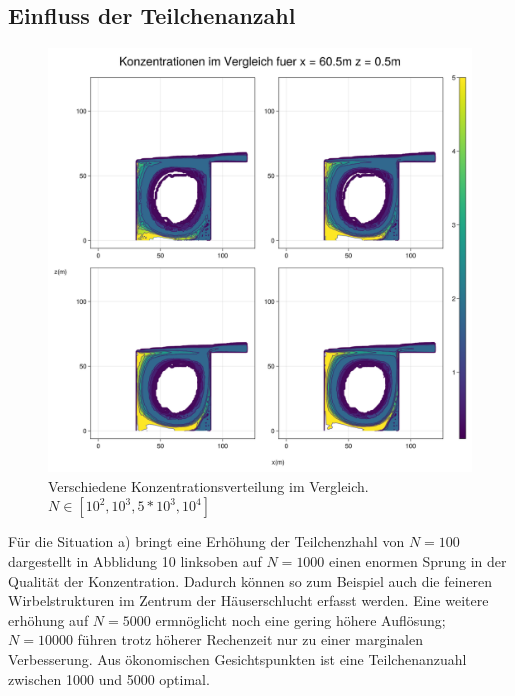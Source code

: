 \documentclass[ngerman]{scrartcl}
\begin{document}
\subsection{Einfluss der Teilchenanzahl}
\begin{figure}[H]
	\centering
	\includegraphics[scale=0.3]{Bilder/3_vergleich_x = 60.5.png}
	\caption{ Verschiedene Konzentrationsverteilung im Vergleich. $N \in[10^2,10^3,5 *10^3,10^4]$}
	\label{fig:my_label}
\end{figure}
Für die Situation a) bringt eine Erhöhung der Teilchenzhahl von $ N=100$ dargestellt in Abblidung 10 linksoben auf  $ N=1000$ einen enormen Sprung in der Qualität der Konzentration. Dadurch können so zum Beispiel auch die feineren Wirbelstrukturen im Zentrum der Häuserschlucht erfasst werden. Eine weitere erhöhung auf $N=5000$ ermnöglicht  noch eine gering höhere Auflösung; $N=10000$ führen trotz höherer Rechenzeit nur zu einer marginalen Verbesserung. Aus ökonomischen Gesichtspunkten ist eine Teilchenanzuahl zwischen 1000 und 5000 optimal.
\end{document}
